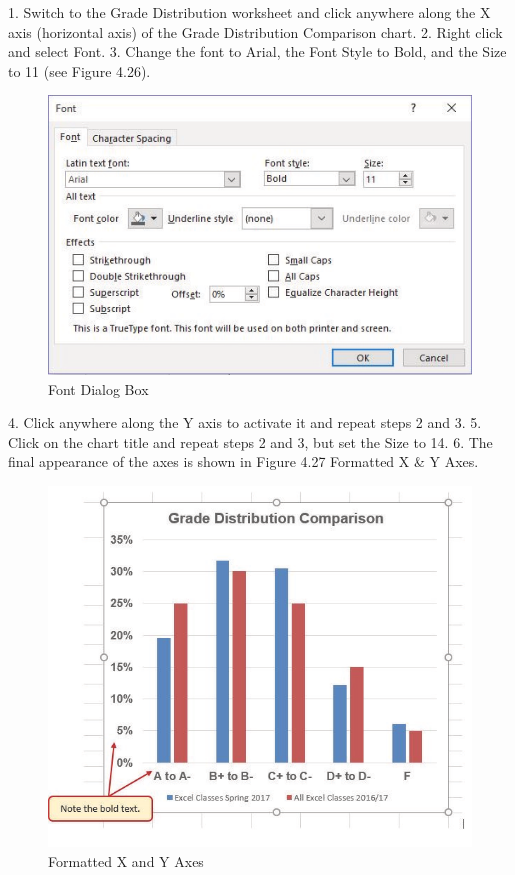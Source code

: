 1. Switch to the Grade Distribution worksheet and click anywhere along the X axis (horizontal
axis) of the Grade Distribution Comparison chart.
2. Right click and select Font.
3. Change the font to Arial, the Font Style to Bold, and the Size to 11 (see Figure 4.26).



\begin{figure}[H]
	\centering
	\includegraphics[width=\maxwidth{.95\linewidth}]{gfx/ch04_fig27}
	\caption{Font Dialog Box}
	\label{04:fig27}
\end{figure}





4. Click anywhere along the Y axis to activate it and repeat steps 2 and 3.
5. Click on the chart title and repeat steps 2 and 3, but set the Size to 14.
6. The final appearance of the axes is shown in Figure 4.27 Formatted X \& Y Axes.



\begin{figure}[H]
	\centering
	\includegraphics[width=\maxwidth{.95\linewidth}]{gfx/ch04_fig28}
	\caption{Formatted X and Y Axes}
	\label{04:fig28}
\end{figure}





